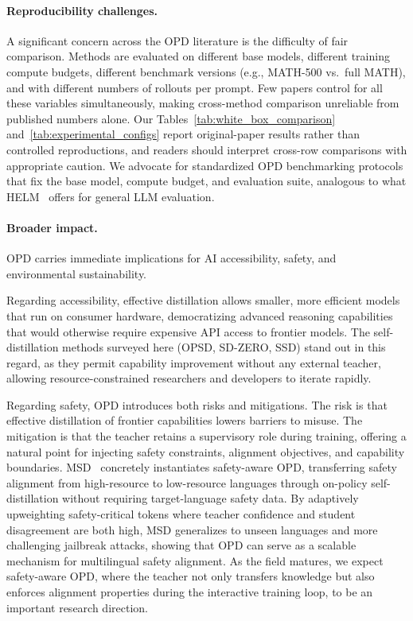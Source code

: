 \documentclass{article} %
\begin{document}
\paragraph{Reproducibility challenges.} A significant concern across the OPD literature is the difficulty of fair comparison. Methods are evaluated on different base models, different training compute budgets, different benchmark versions (e.g., MATH-500 vs.~full MATH), and with different numbers of rollouts per prompt. Few papers control for all these variables simultaneously, making cross-method comparison unreliable from published numbers alone. Our Tables~\ref{tab:white_box_comparison} and~\ref{tab:experimental_configs} report original-paper results rather than controlled reproductions, and readers should interpret cross-row comparisons with appropriate caution. We advocate for standardized OPD benchmarking protocols that fix the base model, compute budget, and evaluation suite, analogous to what HELM~\citep{2211.09110} offers for general LLM evaluation.

\paragraph{Broader impact.} OPD carries immediate implications for AI accessibility, safety, and environmental sustainability.

Regarding accessibility, effective distillation allows smaller, more efficient models that run on consumer hardware, democratizing advanced reasoning capabilities that would otherwise require expensive API access to frontier models. The self-distillation methods surveyed here (OPSD, SD-ZERO, SSD) stand out in this regard, as they permit capability improvement without any external teacher, allowing resource-constrained researchers and developers to iterate rapidly.

Regarding safety, OPD introduces both risks and mitigations. The risk is that effective distillation of frontier capabilities lowers barriers to misuse. The mitigation is that the teacher retains a supervisory role during training, offering a natural point for injecting safety constraints, alignment objectives, and capability boundaries. MSD~\citep{qin2026msd} concretely instantiates safety-aware OPD, transferring safety alignment from high-resource to low-resource languages through on-policy self-distillation without requiring target-language safety data. By adaptively upweighting safety-critical tokens where teacher confidence and student disagreement are both high, MSD generalizes to unseen languages and more challenging jailbreak attacks, showing that OPD can serve as a scalable mechanism for multilingual safety alignment. As the field matures, we expect safety-aware OPD, where the teacher not only transfers knowledge but also enforces alignment properties during the interactive training loop, to be an important research direction.
\end{document}
